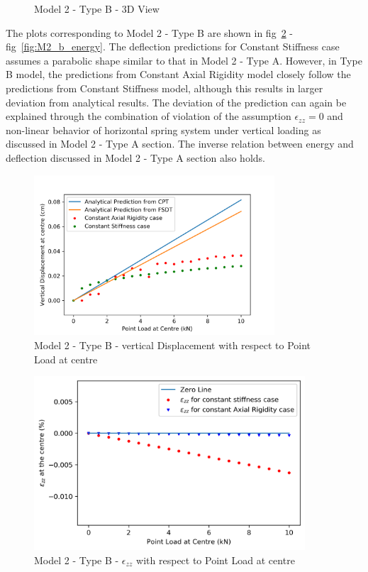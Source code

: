 \begin{figure}[!htbp]
\begin{minipage}{0.3\textwidth}
    \caption{Model 2 - Type B - 3D View}
    \label{fig:M2_b_3D}
\end{minipage}
\end{figure}

The plots corresponding to Model 2 - Type B are shown in fig~\ref{fig:M2_b_plt} - fig~\ref{fig:M2_b_energy}. The deflection predictions for Constant Stiffness case assumes a parabolic shape similar to that in Model 2 - Type A. However, in Type B model, the predictions from Constant Axial Rigidity model closely follow the predictions from Constant Stiffness model, although this results in larger deviation from analytical results. The deviation of the prediction can again be explained through the combination of violation of the assumption $\epsilon_{zz} = 0$ and non-linear behavior of horizontal spring system under vertical loading as discussed in Model 2 - Type A section. The inverse relation between energy and deflection discussed in Model 2 - Type A section also holds.

\begin{figure}[!htbp]
    \centering
    \includegraphics[width = 0.8\textwidth]{Figures/M2_b_plt.png}
    \caption{Model 2 - Type B - vertical Displacement with respect to Point Load at centre}
    \label{fig:M2_b_plt}
\end{figure}

\begin{figure}[!htbp]
    \centering
    \includegraphics[width = 0.9\textwidth]{Figures/M2_b_strain.png}
    \caption{Model 2 - Type B - $\epsilon_{zz}$ with respect to Point Load at centre}
    \label{fig:M2_b_strain_plt}
\end{figure}


